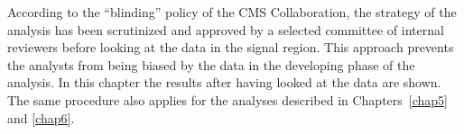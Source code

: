 According to the ``blinding'' policy of the CMS Collaboration, the strategy of the analysis has been scrutinized and approved by a selected committee of internal reviewers before looking at the data in the signal region. This approach prevents the analysts from being biased by the data in the developing phase of the analysis. In this chapter the results after having looked at the data are shown. The same procedure also applies for the analyses described in Chapters~\ref{chap5} and \ref{chap6}.

%


%
%




%

\clearpage

